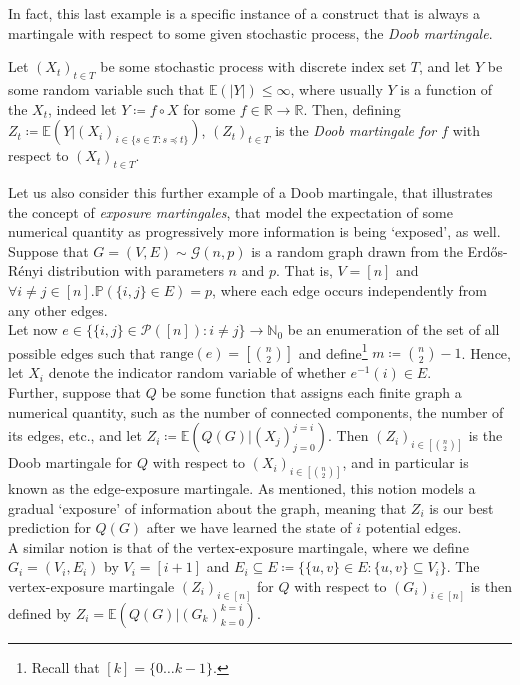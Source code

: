 	In fact, this last example is a specific instance of a construct that is always a 
	martingale with respect to some given stochastic process, the \emph{Doob martingale}.
	\begin{definition}
		Let $(X_t)_{t\in T}$ be some stochastic process with discrete index set $T$, and 
		let $Y$ be
		some random variable such that $\mathbb{E}(|Y|) \leq \infty$, where usually $Y$
		is a function of the $X_t$, indeed let $Y \coloneqq f \circ X$ for some 
		$f \in \mathbb{R}\rightarrow\mathbb{R}$. Then, defining $Z_t \coloneqq 
		\mathbb{E}(Y| (X_i)_{i\in
		\{s\in T : s \preceq t \}})$, $(Z_t)_{t\in T}$ is the \emph{Doob martingale for $f
		$} with respect to $(X_t)_{t\in T}$.
	\end{definition}

	Let us also consider this further example of a Doob martingale, that illustrates the 
	concept of \emph{exposure martingales}, that model the expectation of some numerical 
	quantity as progressively more information is being `exposed', as well. Suppose that 
	$G = (V, E) \sim \mathcal{G}(n, p)$ is a random graph drawn from the Erd\H{o}s-R\'enyi 
	distribution with parameters $n$ and $p$. That is, $V = [n]$ and $\forall i\neq j \in [n] 
	. \mathbb{P}(\{i,j\} \in E) = p$, where each edge occurs independently from any other 
	edges. \\
	Let now $e \in \{\{i,j\} \in \mathcal{P}([n]) : i \neq j\} \rightarrow \mathbb{N}_0$ be
	an enumeration of the set of all possible edges such that $\mathrm{range}(e) = 
	[\binom{n}{2}]$ and define\footnote{Recall that $[k] = \{0 \hdots k-1\}$.} $m \coloneqq 
	\binom{n}{2} - 1$. Hence, let $X_i$ denote the indicator random variable of whether
	$e^{-1}(i) \in E$.\\
	Further, suppose that $Q$ be some function that assigns each finite graph a numerical 
	quantity, such as the number of connected components, the number of its edges, etc., and 
	let $Z_i \coloneqq \mathbb{E}(Q(G) | (X_j)_{j=0}^{j=i})$. Then $(Z_i)_{i \in 
	[\binom{n}{2}]}$ is the Doob martingale for $Q$ with respect to 
	$(X_i)_{i\in[\binom{n}{2}]}$, and in particular is known as the edge-exposure martingale. 
	As mentioned, this notion models a gradual `exposure' of information about the graph, 
	meaning that $Z_i$ is our best prediction for $Q(G)$ after we have learned the state of $i$
	potential edges.\\
	A similar notion is that of the vertex-exposure martingale, where we define 
	$G_i = (V_i, E_i)$ by $V_i = [i+1]$ and $E_i \subseteq E \coloneqq \{\{u, v\}\in E : 
	\{u, v\} \subseteq V_i\}$. The vertex-exposure martingale $(Z_i)_{i\in[n]}$ for $Q$ with 
	respect to $(G_i)_{i\in[n]}$ is then defined by $Z_i = 
	\mathbb{E}(Q(G) | (G_k)_{k=0}^{k=i})$. 

